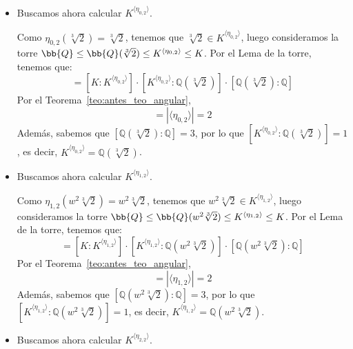 \begin{ejemplo}
\begin{itemize}
        \item Buscamos ahora calcular $K^{\langle \eta_{0,2} \rangle }$.
        
        Como $\eta_{0,2}(\sqrt[3]{2}) = \sqrt[3]{2}$, tenemos que $\sqrt[3]{2}\in K^{\langle \eta_{0,2} \rangle }$, luego consideramos la torre $\bb{Q}\leq \bb{Q}(\sqrt[3]{2})\leq K^{\langle \eta_{0,2} \rangle }\leq K$. Por el Lema de la torre, tenemos que:
        \begin{equation*}
            [K:\mathbb{Q}] = [K:K^{\langle \eta_{0,2} \rangle }]\cdot [K^{\langle \eta_{0,2} \rangle }:\mathbb{Q}(\sqrt[3]{2})]\cdot [\mathbb{Q}(\sqrt[3]{2}):\mathbb{Q}]
        \end{equation*}
        Por el Teorema~\ref{teo:antes_teo_angular},
        \begin{equation*}
            [K:K^{\langle \eta_{0,2} \rangle }] = |\langle \eta_{0,2} \rangle | = 2
        \end{equation*}
        Además, sabemos que $[\mathbb{Q}(\sqrt[3]{2}):\mathbb{Q}] = 3$, por lo que $[K^{\langle \eta_{0,2} \rangle }:\mathbb{Q}(\sqrt[3]{2})] = 1$, es decir, $K^{\langle \eta_{0,2} \rangle } = \mathbb{Q}(\sqrt[3]{2})$.

        \item Buscamos ahora calcular $K^{\langle \eta_{1,2} \rangle }$.
        
        Como $\eta_{1,2}(w^2\sqrt[3]{2}) = w^2\sqrt[3]{2}$, tenemos que $w^2\sqrt[3]{2}\in K^{\langle \eta_{1,2} \rangle }$, luego consideramos la torre $\bb{Q}\leq \bb{Q}(w^2\sqrt[3]{2})\leq K^{\langle \eta_{1,2} \rangle }\leq K$. Por el Lema de la torre, tenemos que:
        \begin{equation*}
            [K:\mathbb{Q}] = [K:K^{\langle \eta_{1,2} \rangle }]\cdot [K^{\langle \eta_{1,2} \rangle }:\mathbb{Q}(w^2\sqrt[3]{2})]\cdot [\mathbb{Q}(w^2\sqrt[3]{2}):\mathbb{Q}]
        \end{equation*}
        Por el Teorema~\ref{teo:antes_teo_angular},
        \begin{equation*}
            [K:K^{\langle \eta_{1,2} \rangle }] = |\langle \eta_{1,2} \rangle | = 2
        \end{equation*}
        Además, sabemos que $[\mathbb{Q}(w^2\sqrt[3]{2}):\mathbb{Q}] = 3$, por lo que $[K^{\langle \eta_{1,2} \rangle }:\mathbb{Q}(w^2\sqrt[3]{2})] = 1$, es decir, $K^{\langle \eta_{1,2} \rangle } = \mathbb{Q}(w^2\sqrt[3]{2})$.

        \item Buscamos ahora calcular $K^{\langle \eta_{2,2} \rangle }$.
        

\end{itemize}
\end{ejemplo}
